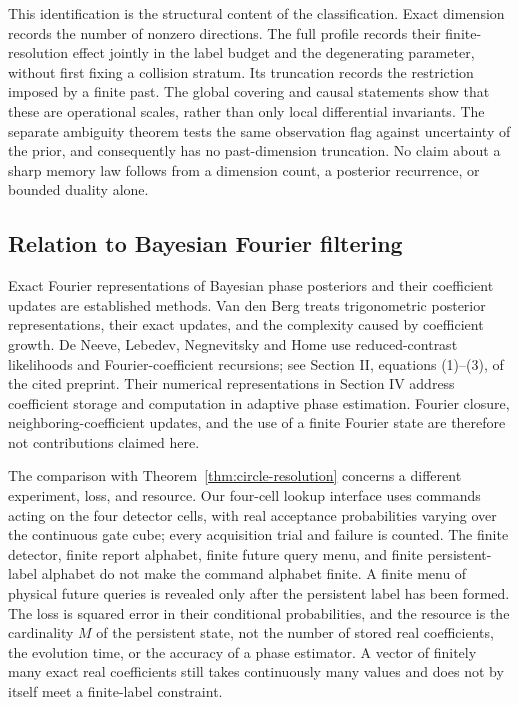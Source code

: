 This identification is the structural content of the classification.
Exact dimension records the number of nonzero directions. The full
profile records their finite-resolution effect jointly in the label
budget and the degenerating parameter, without first fixing a collision
stratum. Its truncation records the restriction imposed by a finite
past. The global covering and causal statements show that these are
operational scales, rather than only local differential invariants.
The separate ambiguity theorem tests the same observation flag against
uncertainty of the prior, and consequently has no past-dimension
truncation. No claim about a sharp memory law follows from a dimension
count, a posterior recurrence, or bounded duality alone.

\subsection{Relation to Bayesian Fourier filtering}
\label{sec:fourier-filtering-comparison}
Exact Fourier representations of Bayesian phase posteriors and their
coefficient updates are established methods. Van den Berg
\cite[Section 2.2, equations (12)--(15)]{VanDenBerg2021} treats
trigonometric posterior representations, their exact updates, and the
complexity caused by coefficient growth. De Neeve, Lebedev, Negnevitsky
and Home \cite{DeNeeveEtAl2025} use reduced-contrast likelihoods and
Fourier-coefficient recursions; see Section II, equations (1)--(3), of
the cited preprint. Their numerical representations in Section IV
address coefficient storage and computation in adaptive phase
estimation. Fourier closure, neighboring-coefficient updates, and the
use of a finite Fourier state are therefore not contributions claimed
here.

The comparison with Theorem~\ref{thm:circle-resolution} concerns a
different experiment, loss, and resource. Our four-cell lookup interface
uses commands acting on the four detector cells, with real acceptance
probabilities varying over the continuous gate cube; every acquisition
trial and failure is counted. The finite detector, finite report alphabet,
finite future query menu, and finite persistent-label alphabet do not
make the command alphabet finite. A finite menu of physical future queries
is revealed only after the persistent label has been formed. The loss
is squared error in their conditional probabilities, and the resource
is the cardinality $M$ of the persistent state, not the number of
stored real coefficients, the evolution time, or the accuracy of a
phase estimator. A vector of finitely many exact real coefficients
still takes continuously many values and does not by itself meet a
finite-label constraint.

